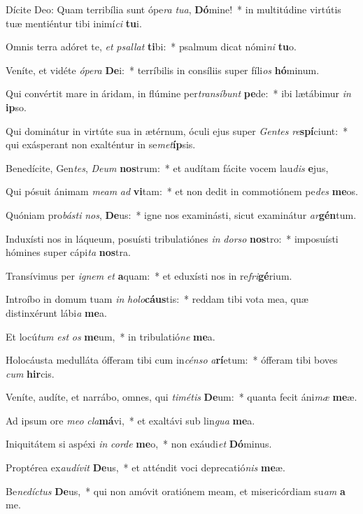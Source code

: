 \item Dícite Deo: Quam terribília sunt ópe\textit{ra} \textit{tu}\textit{a}, \textbf{Dó}mine!~* in multitúdine virtútis tuæ mentiéntur tibi inimí\textit{ci} \textbf{tu}i.
\item Omnis terra adóret te, \textit{et} \textit{psal}\textit{lat} \textbf{ti}bi:~* psalmum dicat nómi\textit{ni} \textbf{tu}o.
\item Veníte, et vidéte \textit{ó}\textit{pe}\textit{ra} \textbf{De}i:~* terríbilis in consíliis super fíli\textit{os} \textbf{hó}minum.
\item Qui convértit mare in áridam, in flúmine per\textit{trans}\textit{í}\textit{bunt} \textbf{pe}de:~* ibi lætábimur \textit{in} \textbf{ip}so.
\item Qui dominátur in virtúte sua in ætérnum, óculi ejus super \textit{Gen}\textit{tes} \textit{re}\textbf{spí}ciunt:~* qui exásperant non exalténtur in se\textit{met}\textbf{íp}sis.
\item Benedícite, Gen\textit{tes}, \textit{De}\textit{um} \textbf{nos}trum:~* et audítam fácite vocem lau\textit{dis} \textbf{e}jus,
\item Qui pósuit ánimam \textit{me}\textit{am} \textit{ad} \textbf{vi}tam:~* et non dedit in commotiónem pe\textit{des} \textbf{me}os.
\item Quóniam pro\textit{bás}\textit{ti} \textit{nos}, \textbf{De}us:~* igne nos examinásti, sicut examinátur \textit{ar}\textbf{gén}tum.
\item Induxísti nos in láqueum, posuísti tribulatiónes \textit{in} \textit{dor}\textit{so} \textbf{nos}tro:~* imposuísti hómines super cápi\textit{ta} \textbf{nos}tra.
\item Transívimus per \textit{i}\textit{gnem} \textit{et} \textbf{a}quam:~* et eduxísti nos in re\textit{fri}\textbf{gé}rium.
\item Introíbo in domum tuam \textit{in} \textit{ho}\textit{lo}\textbf{cáus}tis:~* reddam tibi vota mea, quæ distinxérunt lábi\textit{a} \textbf{me}a.
\item Et locú\textit{tum} \textit{est} \textit{os} \textbf{me}um,~* in tribulatió\textit{ne} \textbf{me}a.
\item Holocáusta medulláta ófferam tibi cum in\textit{cén}\textit{so} \textit{a}\textbf{rí}etum:~* ófferam tibi boves \textit{cum} \textbf{hir}cis.
\item Veníte, audíte, et narrábo, omnes, qui \textit{ti}\textit{mé}\textit{tis} \textbf{De}um:~* quanta fecit áni\textit{mæ} \textbf{me}æ.
\item Ad ipsum ore \textit{me}\textit{o} \textit{cla}\textbf{má}vi,~* et exaltávi sub lin\textit{gua} \textbf{me}a.
\item Iniquitátem si aspéxi \textit{in} \textit{cor}\textit{de} \textbf{me}o,~* non exáudi\textit{et} \textbf{Dó}minus.
\item Proptérea ex\textit{au}\textit{dí}\textit{vit} \textbf{De}us,~* et atténdit voci deprecatió\textit{nis} \textbf{me}æ.
\item Be\textit{ne}\textit{díc}\textit{tus} \textbf{De}us,~* qui non amóvit oratiónem meam, et misericórdiam su\textit{am} \textbf{a} me.
